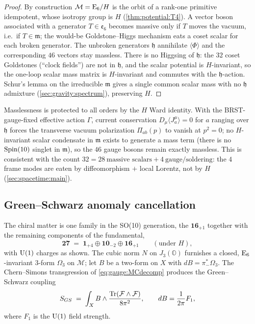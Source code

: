 \begin{proof}
By construction $\mathcal M=\mathrm{E}_{6}/H$ is the orbit of a rank-one primitive
idempotent, whose isotropy group is $H$ (\autoref{thm:potential:T4}).
A vector boson associated with a generator $T\in\mathfrak e_6$ becomes
massive only if $T$ moves the vacuum, i.e.\ if $T\in\mathfrak m$; the
would-be Goldstone--Higgs mechanism eats a coset scalar for each broken
generator. The unbroken generators $\mathfrak h$ annihilate
$\langle\Phi\rangle$ and the corresponding $46$ vectors stay massless.
There is no Higgsing of $\mathfrak h$: the $32$ coset Goldstones
(``clock fields'') are not in $\mathfrak h$, and the scalar potential is
$H$-invariant, so the one-loop scalar mass matrix is $H$-invariant and
commutes with the $\mathfrak h$-action. Schur's lemma on the irreducible
$\mathfrak m$ gives a single common scalar mass with no $\mathfrak h$
admixture (\autoref{sec:gravity:spectrum}), preserving $H$.
\end{proof}

\begin{remark}\label{rem:gauge:ward}
Masslessness is protected to all orders by the $H$ Ward identity. With
the BRST-gauge-fixed effective action $\Gamma$, current conservation
$D_\mu\langle J^{\mu}_{a}\rangle=0$ for $a$ ranging over $\mathfrak h$
forces the transverse vacuum polarization $\Pi_{ab}(p)$ to vanish at
$p^2=0$; no $H$-invariant scalar condensate in $\mathfrak m$ exists to
generate a mass term (there is no $\operatorname{Spin}(10)$ singlet in $\mathfrak m$),
so the $46$ gauge bosons remain exactly massless. This is consistent with
the count $32 = 28\ \text{massive scalars} + 4\ \text{gauge/soldering}$:
the $4$ frame modes are eaten by diffeomorphism $+$ local Lorentz, not by
$H$ (\autoref{sec:spacetime:main}).
\end{remark}

\subsection{Green--Schwarz anomaly cancellation}
\label{sec:gauge:gs}

The chiral matter is one family in the SO(10) generation, the
$\mathbf{16}_{+1}$ together with the remaining components of the
fundamental,
\begin{equation}\label{eq:gauge:matter}
  \mathbf{27}
  \;=\;
  \mathbf 1_{+4}\oplus\mathbf{10}_{-2}\oplus\mathbf{16}_{+1}
  \qquad(\text{under }H),
\end{equation}
with $\mathrm{U}(1)$ charges as shown. The cubic norm $N$ on $J_3(\mathbb O)$
furnishes a closed, $\mathrm{E}_{6}$-invariant $3$-form $\Omega_3$ on $\mathcal M$;
let $B$ be a two-form on $X$ with $dB=\pi_-^{*}\Omega_3$. The
Chern--Simons transgression of \eqref{eq:gauge:MCdecomp} produces the
Green--Schwarz coupling
\begin{equation}\label{eq:gauge:GS}
  S_{GS}
  \;=\;
  \int_{X} B\wedge\frac{\operatorname{Tr}(\mathcal F\wedge\mathcal F)}{8\pi^{2}},
  \qquad
  dB=\frac{1}{2\pi}F_{1},
\end{equation}
where $F_1$ is the $\mathrm{U}(1)$ field strength.

